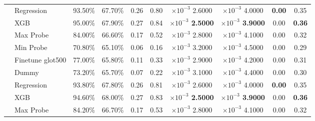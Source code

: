 \begin{tabular}{ll||cccccccc}
	                         & Regression       & 93.50\%                       & 67.70\%           & 0.26           & \multicolumn{1}{c|}{0.80}           & $\times 10^{-3}$ 2.6000           & $\times 10^{-3}$ 4.0000           & \bfseries 0.00 & 0.35          \\
	                         & XGB              & 95.00\%                       & 67.90\%           & 0.27           & \multicolumn{1}{c|}{0.84}           & \bfseries $\times 10^{-3}$ 2.5000 & \bfseries $\times 10^{-3}$ 3.9000 & 0.00           & \bfseries 0.36\\
	                         & Max Probe        & 84.00\%                       & 66.60\%           & 0.17           & \multicolumn{1}{c|}{0.52}           & $\times 10^{-3}$ 2.8000           & $\times 10^{-3}$ 4.1000           & 0.00           & 0.32          \\
	                         & Min Probe        & 70.80\%                       & 65.10\%           & 0.06           & \multicolumn{1}{c|}{0.16}           & $\times 10^{-3}$ 3.2000           & $\times 10^{-3}$ 4.5000           & 0.00           & 0.29          \\
	                         & Finetune glot500 & 77.00\%                       & 65.80\%           & 0.11           & \multicolumn{1}{c|}{0.33}           & $\times 10^{-3}$ 2.9000           & $\times 10^{-3}$ 4.2000           & 0.00           & 0.31          \\\hhline{*{10}{-}}
	\multirow{6}{*}{Spanish} & Dummy            & 73.20\%                       & 65.70\%           & 0.07           & \multicolumn{1}{c|}{0.22}           & $\times 10^{-3}$ 3.1000           & $\times 10^{-3}$ 4.4000           & 0.00           & 0.30          \\
	                         & Regression       & 93.80\%                       & 67.80\%           & 0.26           & \multicolumn{1}{c|}{0.81}           & $\times 10^{-3}$ 2.6000           & $\times 10^{-3}$ 4.0000           & \bfseries 0.00 & 0.35          \\
	                         & XGB              & 94.60\%                       & 68.00\%           & 0.27           & \multicolumn{1}{c|}{0.83}           & \bfseries $\times 10^{-3}$ 2.5000 & \bfseries $\times 10^{-3}$ 3.9000 & 0.00           & \bfseries 0.36\\
	                         & Max Probe        & 84.20\%                       & 66.70\%           & 0.17           & \multicolumn{1}{c|}{0.53}           & $\times 10^{-3}$ 2.8000           & $\times 10^{-3}$ 4.1000           & 0.00           & 0.32          \\

\end{tabular}
